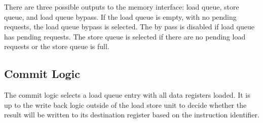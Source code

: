 There are three possible outputs to the memory interface: load queue, store queue, and load queue bypass. If the load queue is empty, with no pending requests, the load queue bypass is selected. The by pass is disabled if load queue has pending requests. The store queue is selected if there are no pending load requests or the store queue is full. 

\subsection{Commit Logic}
The commit logic selects a load queue entry with all data registers loaded. It is up to the write back logic outside of the load store unit to decide whether the result will be written to its destination register based on the instruction identifier.


